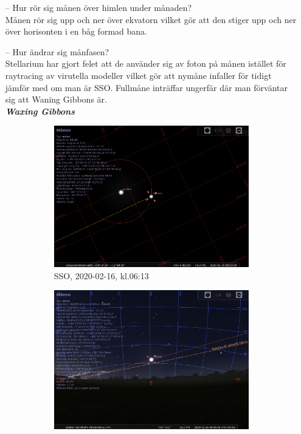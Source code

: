 \documentclass[./exercises.tex]{subfiles}
\begin{document}
\begin{itemize}
\item[--] Hur rör sig månen över himlen under månaden?\\
Månen rör sig upp och ner över ekvatorn vilket gör att den stiger upp och ner över horisonten i en båg
formad bana.
\item[--] Hur ändrar sig månfasen? \\
Stellarium har gjort felet att de använder sig av foton på månen istället för raytracing av
 virutella modeller vilket gör att nymåne infaller för tidigt jämför med om man är SSO.
Fullmåne inträffar ungerfär där man förväntar sig att Waning Gibbons är.\\
\newpage
\textit{\textbf{Waxing Gibbons}}
\begin{figure}[H]
     \centering
     \begin{subfigure}[b]{0.45\textwidth}
         \centering
         \includegraphics[width=\textwidth]{Stellarium1/WXGib/stellarium-000.png}
         \caption{SSO, 2020-02-16, kl.06:13}
         \label{fig:y equals x}
     \end{subfigure}
     \hfill
     \begin{subfigure}[b]{0.45\textwidth}
         \centering
         \includegraphics[width=\textwidth]{Stellarium1/WXGib/stellarium-001.png}

\end{subfigure}
\end{figure}
\end{itemize}
\end{document}
